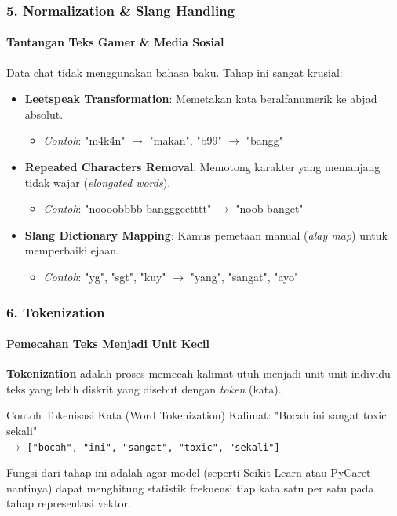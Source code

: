 \documentclass[t,aspectratio=169,xcolor=dvipsnames]{beamer}
\begin{document}
\begin{frame}
    \frametitle{5. Normalization \& Slang Handling}
    \framesubtitle{Tantangan Teks Gamer \& Media Sosial}
    \small
    Data chat tidak menggunakan bahasa baku. Tahap ini sangat krusial:
    \vspace{0.2cm}
    \begin{itemize}
        \item \textbf{Leetspeak Transformation}: Memetakan kata beralfanumerik ke abjad absolut.
        \begin{itemize}
            \item \textit{Contoh}: "m4k4n" $\rightarrow$ "makan", "b99" $\rightarrow$ "bangg"
        \end{itemize}
        \item \textbf{Repeated Characters Removal}: Memotong karakter yang memanjang tidak wajar (\textit{elongated words}).
        \begin{itemize}
            \item \textit{Contoh}: "noooobbbb bangggeetttt" $\rightarrow$ "noob banget"
        \end{itemize}
        \item \textbf{Slang Dictionary Mapping}: Kamus pemetaan manual (\textit{alay map}) untuk memperbaiki ejaan.
        \begin{itemize}
            \item \textit{Contoh}: "yg", "sgt", "kuy" $\rightarrow$ "yang", "sangat", "ayo"
        \end{itemize}
    \end{itemize}
\end{frame}

\begin{frame}
    \frametitle{6. Tokenization}
    \framesubtitle{Pemecahan Teks Menjadi Unit Kecil}
    \small
    \textbf{Tokenization} adalah proses memecah kalimat utuh menjadi unit-unit individu teks yang lebih diskrit yang disebut dengan \textit{token} (kata).
    
    \vspace{0.2cm}
    \begin{exampleblock}{Contoh Tokenisasi Kata (Word Tokenization)}
        Kalimat: "Bocah ini sangat toxic sekali" \\
        $\rightarrow$ \texttt{["bocah", "ini", "sangat", "toxic", "sekali"]}
    \end{exampleblock}
    
    \vspace{0.2cm}
    Fungsi dari tahap ini adalah agar model (seperti Scikit-Learn atau PyCaret nantinya) dapat menghitung statistik frekuensi tiap kata satu per satu pada tahap representasi vektor.
\end{frame}
\end{document}
